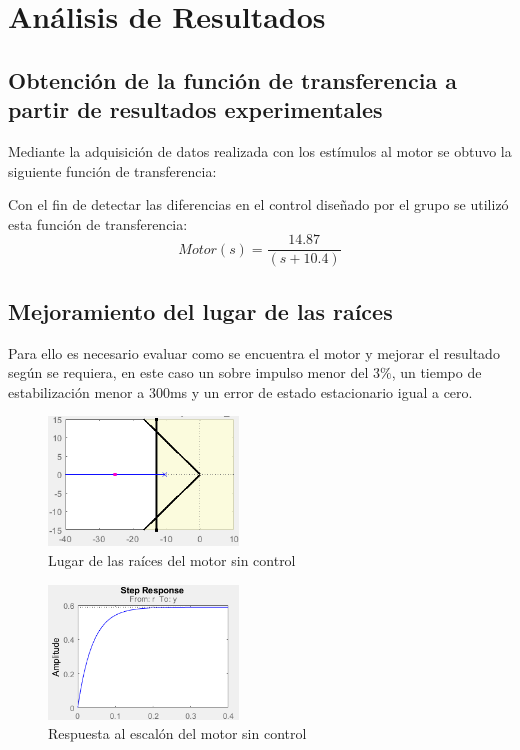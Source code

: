 \documentclass[conference]{IEEEtran}
\begin{document}
\section{Análisis de Resultados}

\subsection{Obtención de la función de transferencia a partir de resultados experimentales}
Mediante la adquisición de datos realizada con los estímulos al motor se obtuvo la siguiente función de transferencia:


Con el fin de detectar las diferencias en el control diseñado por el grupo se utilizó esta función de transferencia:
\begin{equation}
    Motor(s)= \dfrac{14.87}{(s+10.4)}
    \label{EQ_1}
\end{equation}
\subsection{Mejoramiento del lugar de las raíces }

Para ello es necesario evaluar como se encuentra el motor y mejorar el resultado según se requiera, en este caso un sobre impulso menor del 3$\%$, un tiempo de estabilización menor a 300ms y un error de estado estacionario igual a cero.
\begin{figure}[!h]
\centering
\includegraphics[width=0.45\textwidth]{images/rlocusnocontrol.png}
\caption{Lugar de las raíces del motor sin control}
\label{fig:rlocus1}
\end{figure}
\begin{figure}[!h]
\centering
\includegraphics[width=0.45\textwidth]{images/stepnocontrol.png}
\caption{Respuesta al escalón del motor sin control}
\label{fig:step1}
\end{figure}
\end{document}
